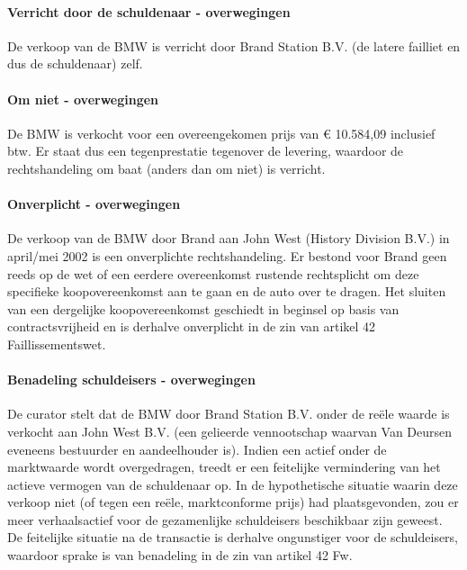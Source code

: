 \documentclass[
  dutch,
  a4paper,
]{article}
\begin{document}
\paragraph{Verricht door de schuldenaar - overwegingen}\label{verricht-door-de-schuldenaar---overwegingen-56}

De verkoop van de BMW is verricht door Brand Station B.V. (de latere failliet en dus de schuldenaar) zelf.

\paragraph{Om niet - overwegingen}\label{om-niet---overwegingen-56}

De BMW is verkocht voor een overeengekomen prijs van € 10.584,09 inclusief btw. Er staat dus een tegenprestatie tegenover de levering, waardoor de rechtshandeling om baat (anders dan om niet) is verricht.

\paragraph{Onverplicht - overwegingen}\label{onverplicht---overwegingen-56}

De verkoop van de BMW door Brand aan John West (History Division B.V.) in april/mei 2002 is een onverplichte rechtshandeling. Er bestond voor Brand geen reeds op de wet of een eerdere overeenkomst rustende rechtsplicht om deze specifieke koopovereenkomst aan te gaan en de auto over te dragen. Het sluiten van een dergelijke koopovereenkomst geschiedt in beginsel op basis van contractsvrijheid en is derhalve onverplicht in de zin van artikel 42 Faillissementswet.

\paragraph{Benadeling schuldeisers - overwegingen}\label{benadeling-schuldeisers---overwegingen-56}

De curator stelt dat de BMW door Brand Station B.V. onder de reële waarde is verkocht aan John West B.V. (een gelieerde vennootschap waarvan Van Deursen eveneens bestuurder en aandeelhouder is). Indien een actief onder de marktwaarde wordt overgedragen, treedt er een feitelijke vermindering van het actieve vermogen van de schuldenaar op. In de hypothetische situatie waarin deze verkoop niet (of tegen een reële, marktconforme prijs) had plaatsgevonden, zou er meer verhaalsactief voor de gezamenlijke schuldeisers beschikbaar zijn geweest. De feitelijke situatie na de transactie is derhalve ongunstiger voor de schuldeisers, waardoor sprake is van benadeling in de zin van artikel 42 Fw.
\end{document}

